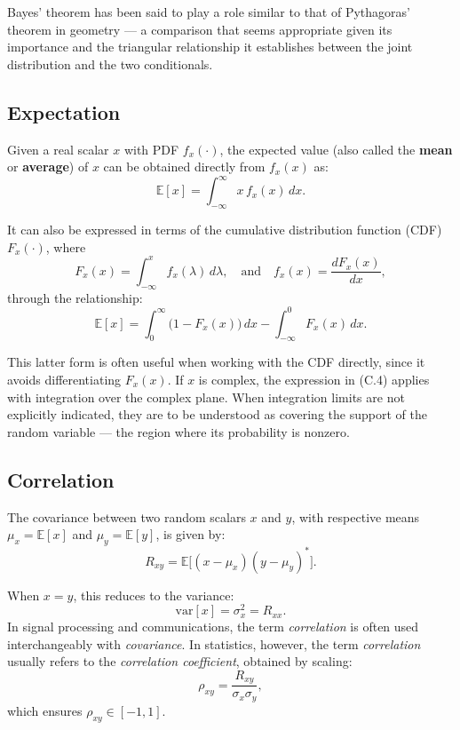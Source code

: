 Bayes’ theorem has been said to play a role similar to that of Pythagoras’ theorem in geometry — a comparison that seems appropriate given its importance and the triangular relationship it establishes between the joint distribution and the two conditionals.

\subsection{Expectation}

Given a real scalar \( x \) with PDF \( f_x(\cdot) \), the expected value (also called the \textbf{mean} or \textbf{average}) of \( x \) can be obtained directly from \( f_x(x) \) as:
\begin{equation}
\mathbb{E}[x] = \int_{-\infty}^{\infty} x \, f_x(x) \, dx.
\tag{C.4}
\end{equation}

It can also be expressed in terms of the cumulative distribution function (CDF) \( F_x(\cdot) \), where
\[
F_x(x) = \int_{-\infty}^{x} f_x(\lambda) \, d\lambda, \quad \text{and} \quad f_x(x) = \frac{dF_x(x)}{dx},
\]
through the relationship:
\begin{equation}
\mathbb{E}[x] = \int_{0}^{\infty} \big(1 - F_x(x)\big) \, dx - \int_{-\infty}^{0} F_x(x) \, dx.
\tag{C.5}
\end{equation}

This latter form is often useful when working with the CDF directly, since it avoids differentiating \( F_x(x) \).  
If \( x \) is complex, the expression in (C.4) applies with integration over the complex plane.  
When integration limits are not explicitly indicated, they are to be understood as covering the support of the random variable — the region where its probability is nonzero.


\subsection{Correlation}

The covariance between two random scalars \( x \) and \( y \), with respective means \( \mu_x = \mathbb{E}[x] \) and \( \mu_y = \mathbb{E}[y] \), is given by:
\begin{equation}
R_{xy} = \mathbb{E}\big[(x - \mu_x)(y - \mu_y)^{*}\big].
\tag{C.6}
\end{equation}

When \( x = y \), this reduces to the variance:
\[
\mathrm{var}[x] = \sigma_x^2 = R_{xx}.
\]
In signal processing and communications, the term \emph{correlation} is often used interchangeably with \emph{covariance}.  
In statistics, however, the term \emph{correlation} usually refers to the \emph{correlation coefficient}, obtained by scaling:
\[
\rho_{xy} = \frac{R_{xy}}{\sigma_x \sigma_y},
\]
which ensures \( \rho_{xy} \in [-1, 1] \).

